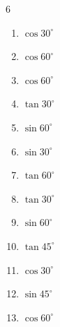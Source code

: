 \begin{multicols}{6}
\begin{enumerate}
  \item $\displaystyle \cos{30^\circ}$


  \item $\displaystyle \cos{60^\circ}$


  \item $\displaystyle \cos{60^\circ}$


  \item $\displaystyle \tan{30^\circ}$


  \item $\displaystyle \sin{60^\circ}$


  \item $\displaystyle \sin{30^\circ}$


  \item $\displaystyle \tan{60^\circ}$


  \item $\displaystyle \tan{30^\circ}$


  \item $\displaystyle \sin{60^\circ}$


  \item $\displaystyle \tan{45^\circ}$

        \phantom{$\displaystyle =1$}

  \item $\displaystyle \cos{30^\circ}$


  \item $\displaystyle \sin{45^\circ}$


  \item $\displaystyle \cos{60^\circ}$


\end{enumerate}
\end{multicols}
